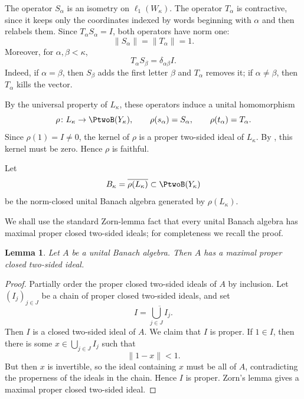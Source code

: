 \documentclass[11pt,reqno]{amsart}
\makeatletter
\theoremstyle{plain}
\newtheorem{lemma}[lemma]{Lemma}
\theoremstyle{definition}
\newcounter{problempaper}
\newenvironment{problempaperbody}{%
  \setcounter{subsection}{0}%
  \setcounter{subsubsection}{0}%
  \setcounter{paragraph}{0}%
  \renewcommand{\thesubsection}{\arabic{subsection}}%
  \renewcommand{\thesubsubsection}{\thesubsection.\arabic{subsubsection}}%
  \renewcommand{\theparagraph}{\thesubsubsection.\arabic{paragraph}}%
  \let\problem@outersection\section
  \let\problem@outersubsection\subsection
  \let\problem@outersubsubsection\subsubsection
  \let\problem@outerparagraph\paragraph
  \let\section\problem@papersection
  \let\subsection\problem@papersubsection
  \let\subsubsection\problem@papersubsubsection
}{%
  \let\section\problem@outersection
  \let\subsection\problem@outersubsection
  \let\subsubsection\problem@outersubsubsection
  \let\paragraph\problem@outerparagraph
}
\newcommand{\problem@target}[2]{%
  \hypertarget{problem-\theproblempaper-#1-#2}{}%
}
\newcommand{\problem@paperheading}[3]{%
  \par\bigskip
  \problem@target{#1}{#2}%
  \noindent{\large\bfseries #2.\quad #3\par}%
  \nobreak\smallskip
}
\newcommand{\problem@papersubheading}[3]{%
  \par\medskip
  \problem@target{#1}{#2}%
  \noindent{\normalsize\bfseries #2.\quad #3\par}%
  \nobreak\smallskip
}
\newcommand{\problem@papersubsubheading}[3]{%
  \par\smallskip
  \problem@target{#1}{#2}%
  \noindent{\normalsize\itshape #2.\quad #3.\ }%
}
\def\problem@papersection{%
  \@ifstar{\problem@papersectionstar}{\problem@papersectionnostar}%
}
\def\problem@papersectionstar#1{%
  \par\bigskip\noindent{\large\bfseries #1\par}\nobreak\smallskip
}
\def\problem@papersectionnostar#1{%
  \refstepcounter{subsection}%
  \setcounter{subsubsection}{0}%
  \setcounter{paragraph}{0}%
  \problem@paperheading{section}{\thesubsection}{#1}%
  \problem@writecontentsline{section}{\thesubsection}{#1}%
}
\def\problem@papersubsection{%
  \@ifstar{\problem@papersubsectionstar}{\problem@papersubsectionnostar}%
}
\def\problem@papersubsectionstar#1{%
  \par\medskip\noindent{\normalsize\bfseries #1\par}\nobreak\smallskip
}
\def\problem@papersubsectionnostar#1{%
  \refstepcounter{subsubsection}%
  \setcounter{paragraph}{0}%
  \problem@papersubheading{subsection}{\thesubsubsection}{#1}%
  \problem@writecontentsline{subsection}{\thesubsubsection}{#1}%
}
\def\problem@papersubsubsection{%
  \@ifstar{\problem@papersubsubsectionstar}{\problem@papersubsubsectionnostar}%
}
\def\problem@papersubsubsectionstar#1{%
  \par\smallskip\noindent{\normalsize\itshape #1.\ }%
}
\def\problem@papersubsubsectionnostar#1{%
  \refstepcounter{paragraph}%
  \problem@papersubsubheading{subsubsection}{\theparagraph}{#1}%
  \problem@writecontentsline{subsubsection}{\theparagraph}{#1}%
}
\newcommand{\problem@writecontentsline}[3]{%
  \begingroup
  \protected@write\@auxout{}{%
    \string\problemcontentsentry{\theproblempaper}{#1}{#2}{#3}{\thepage}%
  }%
  \endgroup
}
\newcommand{\problemcontentsentry}[5]{%
  \@ifundefined{problemcontents@#1}{%
    \expandafter\gdef\csname problemcontents@#1\endcsname{}%
  }{}%
  \expandafter\g@addto@macro\csname problemcontents@#1\endcsname{%
    \problemcontentsline{#1}{#2}{#3}{#4}{#5}%
  }%
}
\newcommand{\problemcontentslink}[4]{%
  \hyperlink{problem-#1-#2-#3}{#4}%
}
\newcommand{\problemcontentsline}[5]{%
  \ifstrequal{#2}{section}{%
    \par\noindent
    \problemcontentslink{#1}{#2}{#3}{\makebox[2.5em][l]{#3}#4}%
    \nobreak\dotfill
    \problemcontentslink{#1}{#2}{#3}{#5}\par
  }{%
    \ifstrequal{#2}{subsection}{%
      \par\noindent\hspace*{1.5em}%
      \problemcontentslink{#1}{#2}{#3}{\makebox[3.5em][l]{#3}#4}%
      \nobreak\dotfill
      \problemcontentslink{#1}{#2}{#3}{#5}\par
    }{%
      \par\noindent\hspace*{3em}%
      \problemcontentslink{#1}{#2}{#3}{\makebox[4.5em][l]{#3}#4}%
      \nobreak\dotfill
      \problemcontentslink{#1}{#2}{#3}{#5}\par
    }%
  }%
}
\makeatother
\begin{document}
\begin{problempaperbody}
The operator $S_\alpha$ is an isometry on $\ell_1(W_\kappa)$. The operator $T_\alpha$ is contractive, since it keeps only the coordinates indexed by words beginning with $\alpha$ and then relabels them. Since $T_\alpha S_\alpha=I$, both operators have norm one:
\begin{equation*}
        \|S_\alpha\|=\|T_\alpha\|=1.
\end{equation*}
Moreover, for $\alpha,\beta<\kappa$,
\begin{equation*}
        T_\alpha S_\beta=\delta_{\alpha\beta}I.
\end{equation*}
Indeed, if $\alpha=\beta$, then $S_\beta$ adds the first letter $\beta$ and $T_\alpha$ removes it; if $\alpha\ne\beta$, then $T_\alpha$ kills the vector.

By the universal property of $L_\kappa$, these operators induce a unital homomorphism
\begin{equation*}
        \rho\colon L_\kappa\to\PtwoB(Y_\kappa),
        \qquad
        \rho(s_\alpha)=S_\alpha,
        \qquad
        \rho(t_\alpha)=T_\alpha.
\end{equation*}
Since $\rho(1)=I\ne0$, the kernel of $\rho$ is a proper two-sided ideal of $L_\kappa$. By , this kernel must be zero. Hence $\rho$ is faithful.

Let
\begin{equation*}
        B_\kappa=\overline{\rho(L_\kappa)}\subset\PtwoB(Y_\kappa)
\end{equation*}
be the norm-closed unital Banach algebra generated by $\rho(L_\kappa)$.

We shall use the standard Zorn-lemma fact that every unital Banach algebra has maximal proper closed two-sided ideals; for completeness we recall the proof.

\begin{lemma}
\label{p2-first:lem:maximal-ideal}
Let $A$ be a unital Banach algebra. Then $A$ has a maximal proper closed two-sided ideal.
\end{lemma}

\begin{proof}
Partially order the proper closed two-sided ideals of $A$ by inclusion. Let $(I_j)_{j\in J}$ be a chain of proper closed two-sided ideals, and set
\begin{equation*}
        I=\overline{\bigcup_{j\in J} I_j}.
\end{equation*}
Then $I$ is a closed two-sided ideal of $A$. We claim that $I$ is proper. If $1\in I$, then there is some $x\in\bigcup_{j\in J}I_j$ such that
\begin{equation*}
        \|1-x\|<1.
\end{equation*}
But then $x$ is invertible, so the ideal containing $x$ must be all of $A$, contradicting the properness of the ideals in the chain. Hence $I$ is proper. Zorn's lemma gives a maximal proper closed two-sided ideal.
\end{proof}


\end{problempaperbody}
\end{document}
